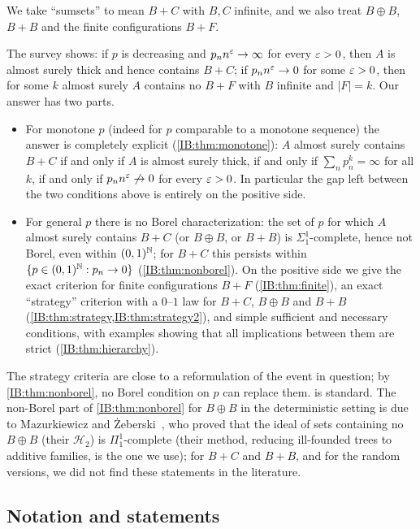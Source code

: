 We take ``sumsets'' to mean $B+C$ with $B,C$ infinite, and we also treat $B\oplus B$, $B+B$ and
the finite configurations $B+F$.

The survey shows: if $p$ is decreasing and $p_nn^\varepsilon\to\infty$ for every $\varepsilon>0$, then
$A$ is almost surely thick and hence contains $B+C$; if $p_nn^\varepsilon\to0$ for some
$\varepsilon>0$, then for some $k$ almost surely $A$ contains no $B+F$ with $B$ infinite and
$|F|=k$. Our answer has two parts.
\begin{itemize}
\item For monotone $p$ (indeed for $p$ comparable to a monotone sequence) the
answer is completely explicit (\cref{IB:thm:monotone}): $A$ almost surely contains
$B+C$ if and only if $A$ is almost surely thick, if and only if $\sum_np_n^k=\infty$
for all $k$, if and only if $p_nn^\varepsilon\not\to0$ for every $\varepsilon>0$. In particular the
gap left between the two conditions above is entirely on the positive side.
\item For general $p$ there is no Borel characterization: the set of $p$ for which $A$
almost surely contains $B+C$ (or $B\oplus B$, or $B+B$) is $\Sigma^1_1$-complete, hence
not Borel, even within $(0,1)^{\mathbb{N}}$; for $B+C$ this persists within
$\{p\in(0,1)^{\mathbb{N}}:p_n\to0\}$ (\cref{IB:thm:nonborel}). On the positive side we give the
exact criterion for finite configurations $B+F$ (\cref{IB:thm:finite}), an exact
``strategy'' criterion with a $0$--$1$ law for $B+C$, $B\oplus B$ and $B+B$
(\cref{IB:thm:strategy,IB:thm:strategy2}), and simple sufficient and necessary
conditions, with examples showing that all implications between them are strict
(\cref{IB:thm:hierarchy}).
\end{itemize}

The strategy criteria are close to a reformulation of the event in question;
by \cref{IB:thm:nonborel}, no Borel condition on $p$ can replace them.
 is standard. The non-Borel part of
\cref{IB:thm:nonborel} for $B\oplus B$ in the deterministic setting is due to
Mazurkiewicz and \.Zeberski~\cite[Theorem~2.6]{mazurkiewicz2023ideal}, who proved
that the ideal of sets containing no $B\oplus B$ (their $\mathcal H_2$) is $\Pi^1_1$-complete (their method,
reducing ill-founded trees to additive families, is the one we use); for $B+C$ and
$B+B$, and for the random versions, we did not find these statements in the
literature.

\subsection{Notation and statements}


